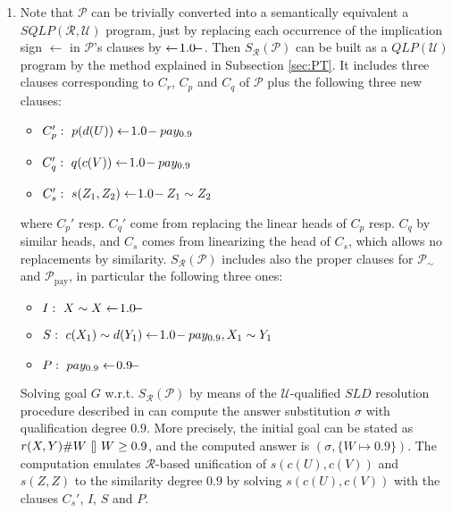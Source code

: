 \documentclass{sigplanconf}
\newcommand{\U}{\mathcal{U}}
\newcommand{\simrel}{\mathcal{R}}
\newcommand{\qlp}[1]{QLP({#1})} \newcommand{\slp}[2]{SLP({#1,#2})} \newcommand{\sqlp}[2]{SQLP({#1,#2})} \newcommand{\bqlp}[1]{BQLP({#1})} \newcommand{\clp}[1]{CLP({#1})}
\newcommand{\trans}[2]{S_{#1}(#2)}
\newcommand{\Prog}{\mathcal{P}} \newcommand{\UProg}{\mathcal{P_U}}
\theoremstyle{definition}
\theoremstyle{plain}
\begin{document}
\begin{enumerate}
    \item Note that $\Prog$ can be trivially converted into a semantically equivalent a $\sqlp{\simrel}{\U}$ program, just by replacing each occurrence of the implication sign $\gets$ in $\Prog$'s clauses by $\gets\!1.0\!-$. Then $\trans{\simrel}{\Prog}$ can be built as a $\qlp{\U}$ program by the method explained in Subsection \ref{sec:PT}. It includes three clauses corresponding to $C_r$, $C_p$ and $C_q$ of $\Prog$ plus the following three new clauses:
        \begin{itemize}
            \item $C_p':\,\, p(d(U)) \gets\!1.0\!- pay_{0.9}$
            \item $C_q':\,\, q(c(V)) \gets\!1.0\!- pay_{0.9}$
            \item $C_s':\,\, s(Z_1,Z_2) \gets\!1.0\!- Z_1 \sim Z_2$
        \end{itemize}
        where $C_p'$ resp. $C_q'$ come from replacing the linear heads of $C_p$ resp. $C_q$ by similar heads, and $C_s$ comes from linearizing the head of $C_s$, which allows no replacements by similarity. $\trans{\simrel}{\Prog}$ includes also the proper clauses for $\Prog_\sim$ and $\Prog_{\mathrm{pay}}$, in particular the following three ones:
    \begin{itemize}
        \item $I:\,\, X \sim X \gets\!1.0\!-$
        \item $S:\,\, c(X_1) \sim d(Y_1) \gets\!1.0\!- pay_{0.9}, X_1 \sim Y_1$
        \item $P:\,\, pay_{0.9} \gets\!0.9\!-$
    \end{itemize}
    Solving goal $G$ w.r.t. $\trans{\simrel}{\Prog}$ by means of the $\U$-qualified $SLD$ resolution procedure described in \cite{RR08} can compute the answer substitution $\sigma$ with qualification degree $0.9$. More precisely, the initial goal can be stated as $r(X,Y)\#W ~{\talloblong}~ W \geq 0.9$, and the computed answer is $(\sigma, \{W \mapsto 0.9\})$. The computation emulates $\simrel$-based unification of $s(c(U),c(V))$ and $s(Z,Z)$ to the similarity degree $0.9$ by solving $s(c(U),c(V))$ with the clauses $C_s'$, $I$, $S$ and $P$.


\end{enumerate}
\end{document}
